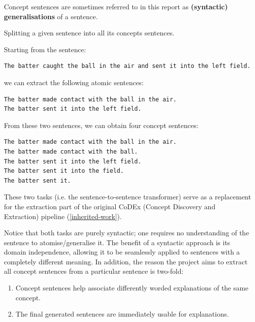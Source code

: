 Concept sentences are sometimes referred to in this report as \textbf{(syntactic) generalisations} of a sentence. 


\begin{example}
Splitting a given sentence into all its concepts sentences.

Starting from the sentence:  
\begin{verbatim}
The batter caught the ball in the air and sent it into the left field.
\end{verbatim}
we can extract the following atomic sentences: 
\begin{verbatim}
The batter made contact with the ball in the air. 
The batter sent it into the left field.
\end{verbatim}
From these two sentences, we can obtain four concept sentences: 
\begin{verbatim}
The batter made contact with the ball in the air.
The batter made contact with the ball.
The batter sent it into the left field.
The batter sent it into the field.
The batter sent it.
\end{verbatim}

\end{example}

These two tasks (i.e. the sentence-to-sentence transformer) serve as a replacement for the extraction part of the original CoDEx (Concept Discovery and Extraction) pipeline (\ref{inherited-work}).

Notice that both tasks are purely syntactic; one requires no understanding of the sentence to atomise/generalise it.
The benefit of a syntactic approach is its domain independence, allowing it to be seamlessly applied to sentences with a completely different meaning.
In addition, the reason the project aims to extract all concept sentences from a particular sentence is two-fold:
\begin{enumerate}
    \item Concept sentences help associate differently worded explanations of the same concept.
    \item The final generated sentences are immediately usable for explanations.
\end{enumerate}



